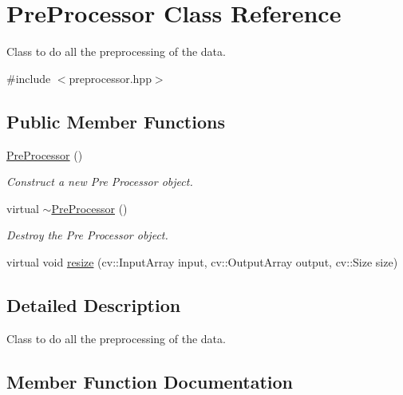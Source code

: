 \hypertarget{classPreProcessor}{}\section{Pre\+Processor Class Reference}
\label{classPreProcessor}


Class to do all the preprocessing of the data.  




{\ttfamily \#include $<$preprocessor.\+hpp$>$}

\subsection*{Public Member Functions}
\begin{DoxyCompactItemize}
\item 
\mbox{\label{classPreProcessor_ab0196882f25fc9aff349f4669d35de22}} 
\hyperlink{classPreProcessor_ab0196882f25fc9aff349f4669d35de22}{Pre\+Processor} ()
\begin{DoxyCompactList}\small\item\em Construct a new Pre Processor object. \end{DoxyCompactList}\item 
\mbox{\label{classPreProcessor_a5f0d6e2fd5982f2c5f197035beaeed6b}} 
virtual \hyperlink{classPreProcessor_a5f0d6e2fd5982f2c5f197035beaeed6b}{$\sim$\+Pre\+Processor} ()
\begin{DoxyCompactList}\small\item\em Destroy the Pre Processor object. \end{DoxyCompactList}\item 
virtual void \hyperlink{classPreProcessor_a49b49d13b2422e02ff7817e965d174df}{resize} (cv\+::\+Input\+Array input, cv\+::\+Output\+Array output, cv\+::\+Size size)
\end{DoxyCompactItemize}


\subsection{Detailed Description}
Class to do all the preprocessing of the data. 

\subsection{Member Function Documentation}
\mbox{\label{classPreProcessor_a49b49d13b2422e02ff7817e965d174df}} 
